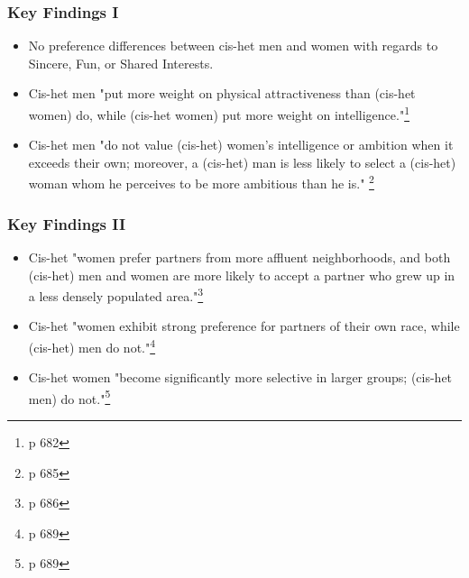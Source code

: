\documentclass{beamer}
\begin{document}
\begin{frame} \frametitle{Key Findings I}
     \begin{itemize}
        \item No preference differences between cis-het men and women with regards to Sincere, Fun, or Shared Interests. \pause
        \item Cis-het men "put more weight on physical attractiveness than (cis-het women) do, while (cis-het women) put more weight on intelligence."\footnote{p 682}  \pause
        \item Cis-het men "do not value (cis-het) women's intelligence or ambition when it exceeds their own; moreover, a (cis-het) man is less likely to select a (cis-het) woman whom he perceives to be more ambitious than he is." \footnote{p 685}
    \end{itemize}
\end{frame}

\begin{frame} \frametitle{Key Findings II}
     \begin{itemize}
        \item Cis-het "women prefer partners from more affluent neighborhoods, and both (cis-het) men and women are more likely to accept a partner who grew up in a less densely populated area."\footnote{p 686} \pause
        \item Cis-het "women exhibit strong preference for partners of their own race, while (cis-het) men do not."\footnote{p 689}
        \item Cis-het women "become significantly more selective in larger groups; (cis-het men) do not."\footnote{p 689}
    \end{itemize}
\end{frame}
\end{document}
